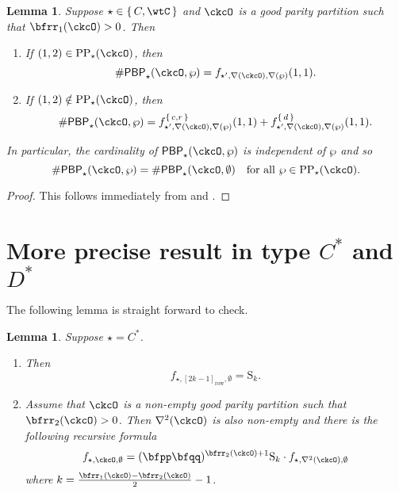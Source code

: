 \documentclass[12pt,a4paper]{amsart}
\newcommand{\CO}{{\mathcal {O}}}
\newcommand{\RS}{{\mathrm {S}}}
\def\DD{\nabla}
\numberwithin{equation}{section}
\newtheorem{lem}[thm]{Lemma}
\theoremstyle{remark}
\def\DD{\nabla}
\def\CPPs{\mathrm{PP}_{\star}}
\def\PBP{\mathsf{PBP}}
\def\PBPop#1#2#3#4{\PBP_{#1}^{#2}(#3,#4)}
\newcommand{\PBPOP}[1][]{\PBPop{\star}{#1}{\ckcO}{\wp}}
\def\yrow#1{\left[#1\right]_{\mathrm{row}}}
\begin{document}
\begin{lem}\label{lem:gf.C}
  Suppose $\star\in\set{C,\wtC}$ and $\ckcO$ is a good parity partition such that $\bfrr_{1}(\ckcO)>0$.
  Then %
  \begin{enumerate}[label=(\alph*)]
    \item If $(1,2)\in \CPPs(\ckcO)$, then
    \[
      \# \PBPOP =  f_{\star',\DD(\ckcO), \DD(\wp)}(1,1).
    \]
    \item If $(1,2)\notin \CPPs(\ckcO)$,
    then
    \[
      \# \PBPOP = f_{\star',\DD(\ckcO), \DD(\wp)}^{\set{c,r}}(1,1) + f_{\star',\DD(\ckcO), \DD(\wp)}^{\set{d}}(1,1).
    \]
  \end{enumerate}
  In particular, the cardinality of $\PBPOP$ is independent of $\wp$ and so
  \[
    \# \PBPOP = \# \PBPop{\star}{}{\ckcO}{\emptyset} \quad \text{for all $\wp\in \CPPs(\ckcO)$.}
  \]
\end{lem}
\begin{proof}
  This follows immediately from  and .
\end{proof}


\section{More precise result in type $C^{*}$ and $D^{*}$}
The following lemma is straight forward  to check.
\begin{lem}\label{lem:gf.C*}
  Suppose $\star = C^{*}$.
  \begin{enumerate}[label=(\alph*)]
    \item Then %
          \[
          f_{\star, \yrow{2k-1},\emptyset} = \RS_{k}.
          \]
    \item Assume that $\ckcO$ is a non-empty good parity partition such that
          $\bfrr_{2}(\ckcO)>0$. Then $\DD^{2}(\ckcO)$ is also non-empty and there is
          the following recursive formula
          \[
          f_{\star,\ckcO,\emptyset} = (\bfpp\bfqq)^{\bfrr_{2}(\ckcO)+1} \RS_{k}\cdot f_{\star,\DD^{2}(\ckcO),\emptyset}
          \]
          where $k = \frac{\bfrr_{1}(\ckcO)-\bfrr_{2}(\ckcO)}{2}-1$.
  \end{enumerate}
\end{lem}
\end{document}
